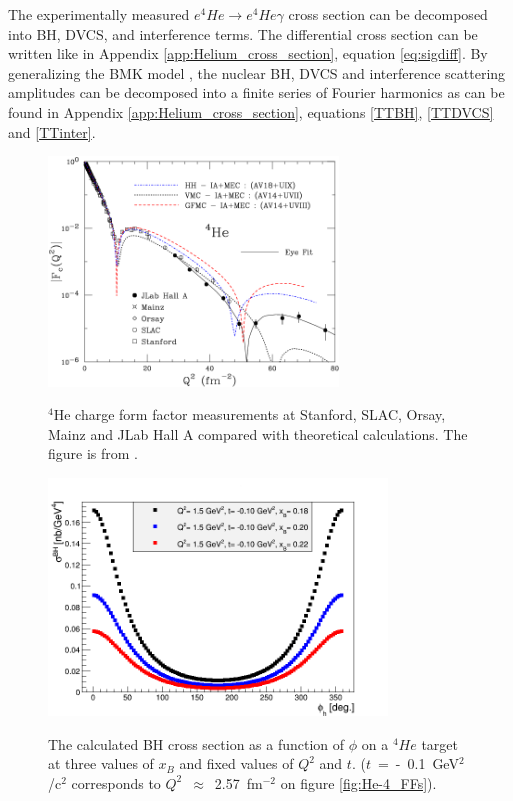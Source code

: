   The experimentally measured $e ^4He \rightarrow e ^4He \gamma$ cross section can be decomposed into BH, DVCS, and interference terms. The differential cross section can be written like in Appendix \ref{app:Helium_cross_section}, equation \ref{eq:sigdiff}. By generalizing the BMK model \cite{Kir}, the nuclear BH, DVCS and interference scattering amplitudes can be decomposed into a finite series of Fourier harmonics as can be found in Appendix \ref{app:Helium_cross_section}, equations \ref{TTBH}, \ref{TTDVCS} and \ref{TTinter}.\\

\begin{figure}[tp]
\begin{minipage}[c]{.46\linewidth}
\hspace{-0.2in}\includegraphics[height=6.1cm]{fig/He-4_FF.png}
\caption{$^4$He charge form factor measurements at Stanford, SLAC, Orsay, Mainz and JLab Hall A compared with theoretical calculations. The figure is from \cite{He_4_FF}. } 
\label{fig:He-4_FFs}
\end{minipage} \hfill
\begin{minipage}[c]{.46\linewidth}
\hspace{-0.3in}\includegraphics[height=6.3cm]{fig/BH_He-4.png}
\caption{The calculated BH cross section as a function of $\phi$ on a $^4He$ target at three values of $x_{B}$ and fixed values of $Q^{2}$ and $t$. ($t$~=~-~0.1~GeV$^2$/c$^2$ corresponds to $Q^2$~$\approx$~2.57~fm$^{-2}$ on figure \ref{fig:He-4_FFs}).}
\vspace{+0.3in}
\label{fig:BH_cross_section_4He}
\end{minipage}
\end{figure}


